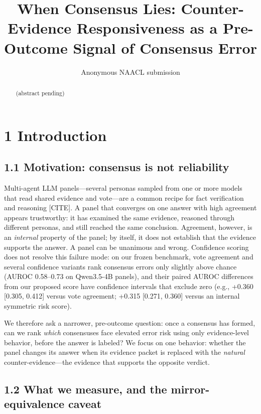 \documentclass[11pt]{article}
\title{When Consensus Lies: Counter-Evidence Responsiveness as a Pre-Outcome Signal of Consensus Error}
\author{Anonymous NAACL submission}
\begin{document}
\maketitle

\begin{abstract}
(abstract pending)
\end{abstract}

\section{1 Introduction}

\subsection{1.1 Motivation: consensus is not reliability}

Multi-agent LLM panels—several personas sampled from one or more models that read shared evidence and vote—are a common recipe for fact verification and reasoning [CITE]. A panel that converges on one answer with high agreement appears trustworthy: it has examined the same evidence, reasoned through different personas, and still reached the same conclusion. Agreement, however, is an \emph{internal} property of the panel; by itself, it does not establish that the evidence supports the answer. A panel can be unanimous and wrong. Confidence scoring does not resolve this failure mode: on our frozen benchmark, vote agreement and several confidence variants rank consensus errors only slightly above chance (AUROC 0.58–0.73 on Qwen3.5-4B panels), and their paired AUROC differences from our proposed score have confidence intervals that exclude zero (e.g., +0.360 [0.305, 0.412] versus vote agreement; +0.315 [0.271, 0.360] versus an internal symmetric risk score).

We therefore ask a narrower, pre-outcome question: once a consensus has formed, can we rank \emph{which} consensuses face elevated error risk using only evidence-level behavior, before the answer is labeled? We focus on one behavior: whether the panel changes its answer when its evidence packet is replaced with the \emph{natural} counter-evidence—the evidence that supports the opposite verdict.

\subsection{1.2 What we measure, and the mirror-equivalence caveat}
\end{document}
